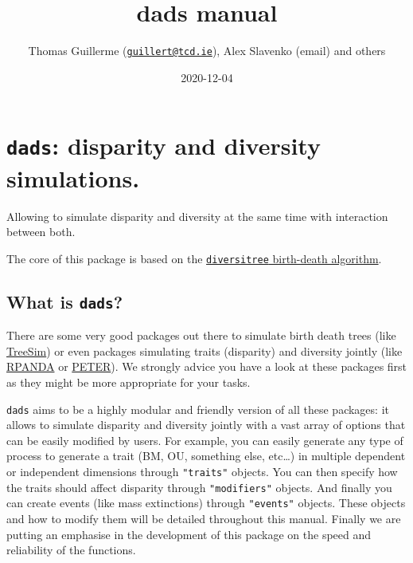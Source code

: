 \documentclass[]{book}
\title{dads manual}
\author{Thomas Guillerme (\href{mailto:guillert@tcd.ie}{\nolinkurl{guillert@tcd.ie}}), Alex Slavenko (email) and others}
\date{2020-12-04}
\begin{document}
\maketitle

{
\setcounter{tocdepth}{1}
\tableofcontents
}
\hypertarget{dads-disparity-and-diversity-simulations.}{%
\chapter{\texorpdfstring{\texttt{dads}: disparity and diversity simulations.}{dads: disparity and diversity simulations.}}\label{dads-disparity-and-diversity-simulations.}}

Allowing to simulate disparity and diversity at the same time with interaction between both.

The core of this package is based on the \href{https://github.com/cran/diversitree/blob/master/R/simulate-bd.R}{\texttt{diversitree} birth-death algorithm}.

\hypertarget{what-is-dads}{%
\section{\texorpdfstring{What is \texttt{dads}?}{What is dads?}}\label{what-is-dads}}

There are some very good packages out there to simulate birth death trees (like \href{https://github.com/tanja819/TreeSim}{TreeSim}) or even packages simulating traits (disparity) and diversity jointly (like \href{https://github.com/cran/RPANDA}{RPANDA} or \href{https://github.com/PuttickMacroevolution/PETER}{PETER}).
We strongly advice you have a look at these packages first as they might be more appropriate for your tasks.

\texttt{dads} aims to be a highly modular and friendly version of all these packages: it allows to simulate disparity and diversity jointly with a vast array of options that can be easily modified by users.
For example, you can easily generate any type of process to generate a trait (BM, OU, something else, etc\ldots{}) in multiple dependent or independent dimensions through \texttt{"traits"} objects.
You can then specify how the traits should affect disparity through \texttt{"modifiers"} objects. And finally you can create events (like mass extinctions) through \texttt{"events"} objects.
These objects and how to modify them will be detailed throughout this manual.
Finally we are putting an emphasise in the development of this package on the speed and reliability of the functions.
\end{document}
